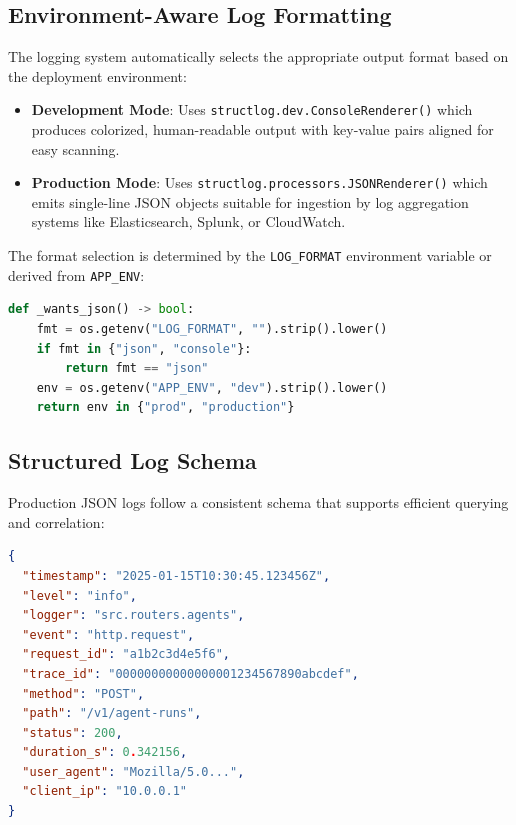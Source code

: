 \subsection{Environment-Aware Log Formatting}

The logging system automatically selects the appropriate output format based on the deployment environment:

\begin{itemize}
    \item \textbf{Development Mode}: Uses \texttt{structlog.dev.ConsoleRenderer()} which produces colorized, human-readable output with key-value pairs aligned for easy scanning.
    
    \item \textbf{Production Mode}: Uses \texttt{structlog.processors.JSONRenderer()} which emits single-line JSON objects suitable for ingestion by log aggregation systems like Elasticsearch, Splunk, or CloudWatch.
\end{itemize}

The format selection is determined by the \texttt{LOG\_FORMAT} environment variable or derived from \texttt{APP\_ENV}:

\begin{lstlisting}[language=Python, caption={Log format selection logic}]
def _wants_json() -> bool:
    fmt = os.getenv("LOG_FORMAT", "").strip().lower()
    if fmt in {"json", "console"}:
        return fmt == "json"
    env = os.getenv("APP_ENV", "dev").strip().lower()
    return env in {"prod", "production"}
\end{lstlisting}

\subsection{Structured Log Schema}

Production JSON logs follow a consistent schema that supports efficient querying and correlation:

\begin{lstlisting}[language=json, caption={Example structured log entry}]
{
  "timestamp": "2025-01-15T10:30:45.123456Z",
  "level": "info",
  "logger": "src.routers.agents",
  "event": "http.request",
  "request_id": "a1b2c3d4e5f6",
  "trace_id": "00000000000000001234567890abcdef",
  "method": "POST",
  "path": "/v1/agent-runs",
  "status": 200,
  "duration_s": 0.342156,
  "user_agent": "Mozilla/5.0...",
  "client_ip": "10.0.0.1"
}
\end{lstlisting}

